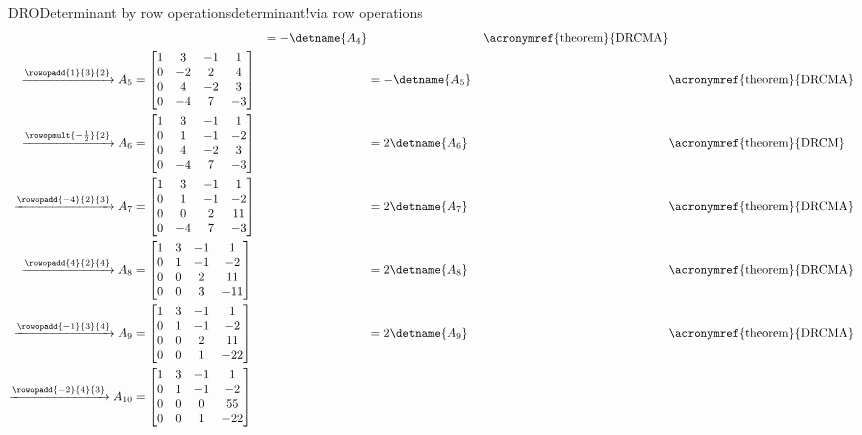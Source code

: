 \begin{example}{DRO}{Determinant by row operations}{determinant!via row operations}
\begin{align*}
&
&=-\detname{A_4}&&\text{\acronymref{theorem}{DRCMA}}\\
\xrightarrow{\rowopadd{1}{3}{2}}
A_5&=
\begin{bmatrix}
1 & 3 &-1 & 1 \\
0 &-2 & 2 & 4 \\
0 & 4 &-2 & 3 \\
0 &-4 & 7 &-3
\end{bmatrix}
&
&=-\detname{A_5}&&\text{\acronymref{theorem}{DRCMA}}\\
\xrightarrow{\rowopmult{-\frac{1}{2}}{2}}
A_6&=
\begin{bmatrix}
1 & 3 &-1 & 1 \\
0 & 1 &-1 &-2 \\
0 & 4 &-2 & 3 \\
0 &-4 & 7 &-3
\end{bmatrix}
&
&=2\detname{A_6}&&\text{\acronymref{theorem}{DRCM}}\\
\xrightarrow{\rowopadd{-4}{2}{3}}
A_7&=
\begin{bmatrix}
1 & 3 &-1 & 1 \\
0 & 1 &-1 &-2 \\
0 & 0 & 2 &11 \\
0 &-4 & 7 &-3
\end{bmatrix}
&
&=2\detname{A_7}&&\text{\acronymref{theorem}{DRCMA}}\\
\xrightarrow{\rowopadd{4}{2}{4}}
A_8&=
\begin{bmatrix}
1 & 3 &-1 & 1 \\
0 & 1 &-1 &-2 \\
0 & 0 & 2 &11 \\
0 & 0 & 3 &-11
\end{bmatrix}
&
&=2\detname{A_8}&&\text{\acronymref{theorem}{DRCMA}}\\
\xrightarrow{\rowopadd{-1}{3}{4}}
A_9&=
\begin{bmatrix}
1 & 3 &-1 & 1 \\
0 & 1 &-1 &-2 \\
0 & 0 & 2 &11 \\
0 & 0 & 1 &-22
\end{bmatrix}
&
&=2\detname{A_9}&&\text{\acronymref{theorem}{DRCMA}}\\
\xrightarrow{\rowopadd{-2}{4}{3}}
A_{10}&=
\begin{bmatrix}
1 & 3 &-1 & 1 \\
0 & 1 &-1 &-2 \\
0 & 0 & 0 &55 \\
0 & 0 & 1 &-22
\end{bmatrix}

\end{align*}
\end{example}
